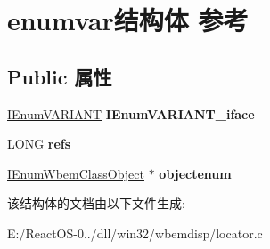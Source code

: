 \hypertarget{structenumvar}{}\section{enumvar结构体 参考}
\label{structenumvar}
\subsection*{Public 属性}
\begin{DoxyCompactItemize}
\item 
\mbox{\label{structenumvar_ace562571b8653d9563de1c35cb145315}} 
\hyperlink{interface_i_enum_v_a_r_i_a_n_t}{I\+Enum\+V\+A\+R\+I\+A\+NT} {\bfseries I\+Enum\+V\+A\+R\+I\+A\+N\+T\+\_\+iface}
\item 
\mbox{\label{structenumvar_a558477cf134200505b949fdafebd9430}} 
L\+O\+NG {\bfseries refs}
\item 
\mbox{\label{structenumvar_af4c96a11b2d9a14f93fff8c335daf78e}} 
\hyperlink{interface_i_enum_wbem_class_object}{I\+Enum\+Wbem\+Class\+Object} $\ast$ {\bfseries objectenum}
\end{DoxyCompactItemize}


该结构体的文档由以下文件生成\+:\begin{DoxyCompactItemize}
\item 
E\+:/\+React\+O\+S-\/0../dll/win32/wbemdisp/locator.\+c\end{DoxyCompactItemize}
